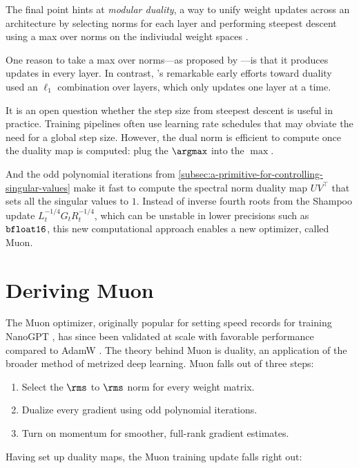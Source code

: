 The final point hints at \textit{modular duality}, a way to unify weight updates across an architecture by selecting norms for each layer and performing steepest descent using a max over norms on the indiviudal weight spaces \citep{bernstein2024duality}.

One reason to take a max over norms---as proposed by \citet{large2024}---is that it produces updates in every layer. In contrast, \citet{flynn2017duality}'s remarkable early efforts toward duality used an $\ell_1$ combination over layers, which only updates one layer at a time.

It is an open question whether the step size from steepest descent is useful in practice. Training pipelines often use learning rate schedules that may obviate the need for a global step size. However, the dual norm is efficient to compute once the duality map is computed: plug the $\argmax$ into the $\max$.

And the odd polynomial iterations from \cref{subsec:a-primitive-for-controlling-singular-values} make it fast to compute the spectral norm duality map $UV^\top$ that sets all the singular values to $1$. Instead of inverse fourth roots from the Shampoo update $L_t^{-1/4} G_t R_t^{-1/4}$, which can be unstable in lower precisions such as $\verb|bfloat16|$, this new computational approach enables a new optimizer, called Muon.

\section{Deriving Muon}
\label{subsec:deriving-muon}

The Muon optimizer, originally popular for setting speed records for training NanoGPT \citep{jordan2024muon}, has since been validated at scale with favorable performance compared to AdamW \citep{liu2025muonscalablellmtraining,shah2025muonpretraining}. The theory behind Muon is duality, an application of the broader method of metrized deep learning. Muon falls out of three steps:

\begin{enumerate}
    \item Select the $\rms$ to $\rms$ norm for every weight matrix.
    \item Dualize every gradient using odd polynomial iterations.
    \item Turn on momentum for smoother, full-rank gradient estimates.
\end{enumerate}

Having set up duality maps, the Muon training update falls right out:

